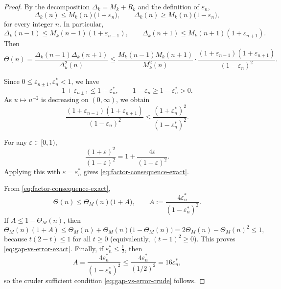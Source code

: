 \documentclass[12pt]{article}
\numberwithin{equation}{section}
\begin{document}
\begin{proof}

By the decomposition $\Delta_k=M_k+R_k$ and the definition of $\varepsilon_n$,
\[
\Delta_k(n)\le M_k(n)\bigl(1+\varepsilon_n\bigr),\qquad
\Delta_k(n)\ge M_k(n)\bigl(1-\varepsilon_n\bigr),
\]
for every integer $n$. In particular,
\[
\Delta_k(n-1)\le M_k(n-1)(1+\varepsilon_{n-1}),\qquad
\Delta_k(n+1)\le M_k(n+1)(1+\varepsilon_{n+1}).
\]
Then
\[
\Theta(n)=\frac{\Delta_k(n-1)\Delta_k(n+1)}{\Delta_k^2(n)}
\le\frac{M_k(n-1)M_k(n+1)}{M_k^2(n)}\cdot
\frac{(1+\varepsilon_{n-1})(1+\varepsilon_{n+1})}{(1-\varepsilon_n)^2}.
\]

Since $0\le \varepsilon_{n\pm1},\varepsilon_n^\ast<1$, we have
\[
1+\varepsilon_{n\pm1}\le1+\varepsilon_n^\ast,\qquad
1-\varepsilon_n\ge1-\varepsilon_n^\ast>0.
\]
As $u\mapsto u^{-2}$ is decreasing on $(0,\infty)$, we obtain
\[
\frac{(1+\varepsilon_{n-1})(1+\varepsilon_{n+1})}{(1-\varepsilon_n)^2}
\le
\frac{(1+\varepsilon_n^\ast)^2}{(1-\varepsilon_n^\ast)^2}.
\]

For any $\varepsilon\in[0,1)$,
\[
\frac{(1+\varepsilon)^2}{(1-\varepsilon)^2}
= 1+\frac{4\varepsilon}{(1-\varepsilon)^2}.
\]
Applying this with $\varepsilon=\varepsilon_n^\ast$ gives \eqref{eq:factor-consequence-exact}.

From \eqref{eq:factor-consequence-exact},
\[
\Theta(n)\le\Theta_M(n)\bigl(1+A\bigr),\qquad
A:=\frac{4\varepsilon_n^\ast}{(1-\varepsilon_n^\ast)^2}.
\]
If $A\le 1-\Theta_M(n)$, then
\[
\Theta_M(n)(1+A)\le\Theta_M(n)+\Theta_M(n)\bigl(1-\Theta_M(n)\bigr)
=2\Theta_M(n)-\Theta_M(n)^2\le1,
\]
because $t(2-t)\le1$ for all $t\ge0$ (equivalently, $(t-1)^2\ge0$).
This proves \eqref{eq:gap-vs-error-exact}. Finally, if $\varepsilon_n^\ast\le\tfrac12$, then
\[
A=\frac{4\varepsilon_n^\ast}{(1-\varepsilon_n^\ast)^2}\le\frac{4\varepsilon_n^\ast}{(1/2)^2}=16\varepsilon_n^\ast,
\]
so the cruder sufficient condition \eqref{eq:gap-vs-error-crude} follows.
\end{proof}
\end{document}
